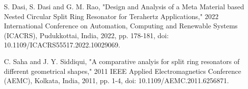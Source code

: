 \documentclass[conference]{IEEEtran}
\begin{document}
\begin{thebibliography}{00}
 S. Dasi, S. Dasi and G. M. Rao, "Design and Analysis of a Meta Material based Nested Circular Split Ring Resonator for Terahertz Applications," 2022 International Conference on Automation, Computing and Renewable Systems (ICACRS), Pudukkottai, India, 2022, pp. 178-181, doi: 10.1109/ICACRS55517.2022.10029069.

C. Saha and J. Y. Siddiqui, "A comparative analyis for split ring resonators of different geometrical shapes," 2011 IEEE Applied Electromagnetics Conference (AEMC), Kolkata, India, 2011, pp. 1-4, doi: 10.1109/AEMC.2011.6256871.









\end{thebibliography}
\end{document}
